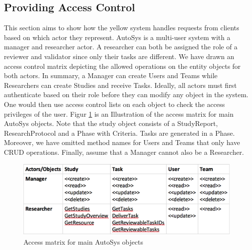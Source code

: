 \subsection{Providing Access Control}
This section aims to show how the yellow system handles requests from clients based on which actor they represent. AutoSys is a multi-user system with a manager and researcher actor. A researcher can both be assigned the role of a reviewer and validator since only their tasks are different. We have drawn an access control matrix depicting the allowed operations on the entity objects for both actors. In summary, a Manager can create Users and Teams while Researchers can create Studies and receive Tasks. Ideally, all actors must first authenticate based on their role before they can modify any object in the system. One would then use access control lists on each object to check the access privileges of the user. 
Figur \ref{fig:accessmatrix} is an Illustration of the access matrix for main AutoSys objects. Note that the study object consists of a StudyReport, ResearchProtocol and a Phase with Criteria. Tasks are generated in a Phase. Moreover, we have omitted method names for Users and Teams that only have CRUD operations. Finally, assume that a Manager cannot also be a Researcher. 

\begin{figure}[H]
	\includegraphics[width = \linewidth]{Images/accessmatrix}
	\caption{Access matrix for main AutoSys objects}
	\label{fig:accessmatrix}
\end{figure}

